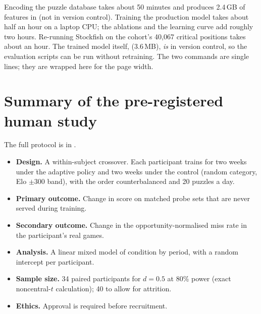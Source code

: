\noindent Encoding the puzzle database takes about 50 minutes and produces 2.4\,GB of features in
 (not in version control). Training the production model takes about half an hour
on a laptop CPU; the ablations and the learning curve add roughly two hours. Re-running Stockfish on
the cohort's 40{,}067 critical positions takes about an hour. The trained model itself,
 (3.6\,MB), \emph{is} in version control, so the evaluation
scripts can be run without retraining. The two  commands are single
lines; they are wrapped here for the page width.

\section{Summary of the pre-registered human study}

The full protocol is in .
\begin{itemize}
  \item \textbf{Design.} A within-subject crossover. Each participant trains for two weeks under the
        adaptive policy and two weeks under the control (random category, Elo $\pm 300$ band), with the
        order counterbalanced and 20 puzzles a day.
  \item \textbf{Primary outcome.} Change in score on matched probe sets that are never served during
        training.
  \item \textbf{Secondary outcome.} Change in the opportunity-normalised miss rate in the participant's
        real games.
  \item \textbf{Analysis.} A linear mixed model of condition by period, with a random intercept per
        participant.
  \item \textbf{Sample size.} 34 paired participants for $d=0.5$ at 80\% power (exact noncentral-$t$
        calculation); 40 to allow for attrition.
  \item \textbf{Ethics.} Approval is required before recruitment. 
\end{itemize}
